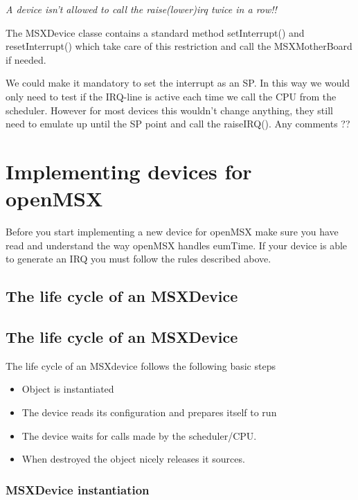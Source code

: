 \documentclass[11pt, a4paper]{report}
\begin{document}
\emph{A device isn't allowed to call the raise(lower)irq twice in a row!!}

The MSXDevice classe contains a standard method setInterrupt() and
resetInterrupt() which take care of this restriction and call the
MSXMotherBoard if needed.

We could make it mandatory to set the interrupt as an SP. In this way we
would only need to test if the IRQ-line is active each time we call the
CPU from the scheduler. However for most devices this wouldn't change
anything, they still need to emulate up until the SP point and call the
raiseIRQ(). Any comments ??

\chapter{Implementing devices for openMSX}
Before you start implementing a new device for openMSX make sure you have read and understand the way openMSX handles eumTime. If your device is able to generate an IRQ you must follow the rules described above.
\section{The life cycle of an MSXDevice}

\section{The life cycle of an MSXDevice}
The life cycle of an MSXdevice follows the following basic steps
\begin{itemize}
\item Object is instantiated
\item The device reads its configuration and prepares itself to run
\item The device waits for calls made by the scheduler/CPU.
\item When destroyed the object nicely releases it sources.
\end{itemize}

\subsection{MSXDevice instantiation}
\end{document}
